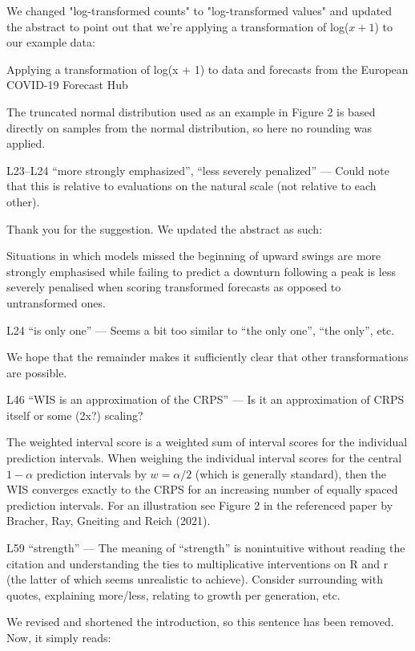 \documentclass{article}
\newcommand{\black}{\color{black}}
\newcommand{\blue}{\color{blue}}
\newcommand{\indented}{\setlength{\leftskip}{1cm}}
\newcommand{\notindented}{\setlength{\leftskip}{0cm}}
\begin{document}
\black
We changed "log-transformed counts" to "log-transformed values" and updated the abstract to point out that we're applying a transformation of log($x + 1$) to our example data: 

\indented
Applying a transformation of log(x + 1) to data and forecasts from the European COVID-19 Forecast Hub

\notindented

The truncated normal distribution used as an example in Figure 2 is based directly on samples from the normal distribution, so here no rounding was applied. 

\blue
L23–L24 “more strongly emphasized”, “less severely penalized” — Could note that this is relative to evaluations on the natural scale (not relative to each other).

\black
Thank you for the suggestion. We updated the abstract as such: 

\indented
Situations in which models missed the beginning of upward swings are more strongly emphasised while failing to predict a downturn following a peak is less severely penalised when scoring transformed forecasts as opposed to untransformed ones.

\notindented

\blue
L24 “is only one” — Seems a bit too similar to “the only one”, “the only”, etc.

\black
We hope that the remainder makes it sufficiently clear that other transformations are possible. 

\blue
L46 “WIS is an approximation of the CRPS” — Is it an approximation of CRPS itself or some (2x?) scaling?

\black
The weighted interval score is a weighted sum of interval scores for the individual prediction intervals. When weighing the individual interval scores for the central $1 - \alpha$ prediction intervals by 
$w = \alpha / 2$ (which is generally standard), then the WIS converges exactly to the CRPS for an increasing number of equally spaced prediction intervals. For an illustration see Figure 2 in the referenced paper by Bracher, Ray, Gneiting and Reich (2021).

\blue
L59 “strength” — The meaning of “strength” is nonintuitive without reading the citation and understanding the ties to multiplicative interventions on R and r (the latter of which seems unrealistic to achieve). Consider surrounding with quotes, explaining more/less, relating to growth per generation, etc.

\black
We revised and shortened the introduction, so this sentence has been removed. Now, it simply reads: 
\end{document}
